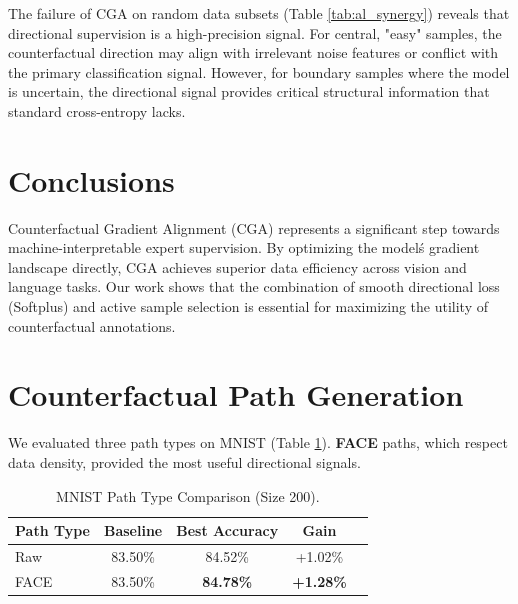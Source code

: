 \documentclass[sigconf,anonymous]{aamas}
\begin{document}
The failure of CGA on random data subsets (Table \ref{tab:al_synergy}) reveals that directional supervision is a high-precision signal. For central, "easy" samples, the counterfactual direction may align with irrelevant noise features or conflict with the primary classification signal. However, for boundary samples where the model is uncertain, the directional signal provides critical structural information that standard cross-entropy lacks.

\section{Conclusions}
\label{sec:conclusions}
Counterfactual Gradient Alignment (CGA) represents a significant step towards machine-interpretable expert supervision. By optimizing the model\'s gradient landscape directly, CGA achieves superior data efficiency across vision and language tasks. Our work shows that the combination of smooth directional loss (Softplus) and active sample selection is essential for maximizing the utility of counterfactual annotations.

\balance



\appendix
\section{Counterfactual Path Generation}
We evaluated three path types on MNIST (Table \ref{tab:mnist_paths}). \textbf{FACE} paths, which respect data density, provided the most useful directional signals.

\begin{table}[h]
\centering
\caption{MNIST Path Type Comparison (Size 200).}
\label{tab:mnist_paths}
\begin{tabular}{lcccc}
\toprule
\textbf{Path Type} & \textbf{Baseline} & \textbf{Best Accuracy} & \textbf{Gain} \\
\midrule
Raw & 83.50\% & 84.52\% & +1.02\% \\
FACE & 83.50\% & \textbf{84.78\%} & \textbf{+1.28\%} \\
\bottomrule
\end{tabular}
\end{table}
\end{document}
